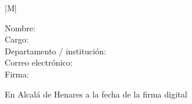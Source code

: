 \documentclass[10pt,a4paper,oneside]{article}
\begin{document}
\ifCoTutorPresent
{

\noindent
\begin{tabular}{|M{\textwidth}|}
\hline
\textbf{\small \MakeUppercase{\wordCoTutorOrCoTutora}}\vspace*{-5.5pt}\\
\hline
\end{tabular}


\begin{description}
  \item[Nombre:] \myCoTutorFullName
  \item[Cargo:] \myCoTutorPosition
  \item[Departamento / institución:] \AcademicCotutorAffiliation
  \item[Correo electrónico:] \myCoTutorEmail
  \item[Firma:]
\end{description}
}
{
}

\vspace{2.25cm}


\noindent En Alcalá de Henares a la fecha de la firma digital %

\end{document}
